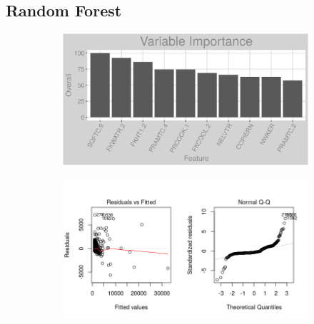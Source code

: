 \subsection{Random Forest}
\label{appendix:fuel_oil:rf}
\begin{figure}[h]
\centering
\begin{subfigure}{1\textwidth}
\centering
\includegraphics[width=.99\textwidth, height=0.3\textheight]{Images/fuel_oil_rf_vars.png}
\end{subfigure}
\begin{subfigure}{1\textwidth}
\centering
\includegraphics[width=.99\textwidth, height=0.475\textheight]{Images/fuel_oil_rf_res_1.png}
\end{subfigure}
\end{figure}
\FloatBarrier
\newpage
